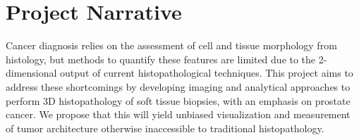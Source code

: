 \documentclass{NIHGrant}
\begin{document}
\part*{Project Narrative}
Cancer diagnosis relies on the assessment of cell and tissue morphology from histology, but methods to quantify these features are limited due to the 2-dimensional output of current histopathological techniques. This project aims to address these shortcomings by developing imaging and analytical approaches to perform 3D histopathology of soft tissue biopsies, with an emphasis on prostate cancer. We propose that this will yield unbiased visualization and measurement of tumor architecture otherwise inaccessible to traditional histopathology.

\newpage

\end{document}
